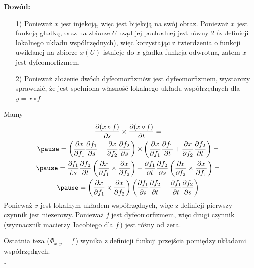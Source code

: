 \begin{frame}

\textcolor{ared}{\textbf{Dowód:}}\\\pause

\begin{itemize}
\item [1)] Ponieważ $x$ jest injekcją, więc jest bijekcją na swój obraz. \pause Ponieważ $x$ jest funkcją gładką, oraz na zbiorze $U$ rząd jej pochodnej jest równy $2$ (z definicji lokalnego układu współrzędnych), \pause więc korzystając z twierdzenia o funkcji uwikłanej na zbiorze $x(U)$ istnieje do $x$ gładka funkcja odwrotna, zatem $x$ jest dyfeomorfizmem.
\item [2)] Ponieważ złożenie dwóch dyfeomorfizmów jest dyfeomorfizmem, wystarczy sprawdzić, że jest spełniona własność lokalnego układu współrzędnych dla $y=x\circ f$. 
\end{itemize}

\end{frame}
\begin{frame}
Mamy
\begin{multline*}
\frac{\partial (x\circ f)}{\partial s}\times \frac{\partial (x\circ f)}{\partial t}=\\\pause
=\left(\frac{\partial x}{\partial f_1}\frac{\partial f_1}{\partial s}+\frac{\partial x}{\partial f_2}\frac{\partial f_2}{\partial s}\right)\times
\left(\frac{\partial x}{\partial f_1}\frac{\partial f_1}{\partial t}+\frac{\partial x}{\partial f_2}\frac{\partial f_2}{\partial t}\right)=\\ \pause
=\frac{\partial f_1}{\partial s}\frac{\partial f_2}{\partial t}\left(\frac{\partial x}{\partial f_1}\times \frac{\partial x}{\partial f_2}\right)+\frac{\partial f_1}{\partial t}\frac{\partial f_2}{\partial s}\left(\frac{\partial x}{\partial f_2}\times \frac{\partial x}{\partial f_1}\right)=\\\pause
=\left(\frac{\partial x}{\partial f_1}\times \frac{\partial x}{\partial f_2}\right)\left(\frac{\partial f_1}{\partial s}\frac{\partial f_2}{\partial t}-\frac{\partial f_1}{\partial t}\frac{\partial f_2}{\partial s}\right)
\end{multline*}
\pause Ponieważ $x$ jest lokalnym układem współrzędnych, więc z definicji pierwszy czynnik jest niezerowy. 
Ponieważ $f$ jest dyfeomorfizmem, więc drugi czynnik (wyznacznik macierzy Jacobiego dla $f$\,) jest różny od zera.

\pause Ostatnia teza ($\Phi_{x,y}=f$\,) wynika z definicji funkcji przejścia pomiędzy układami współrzędnych.

\hfill $\square$

\end{frame}
